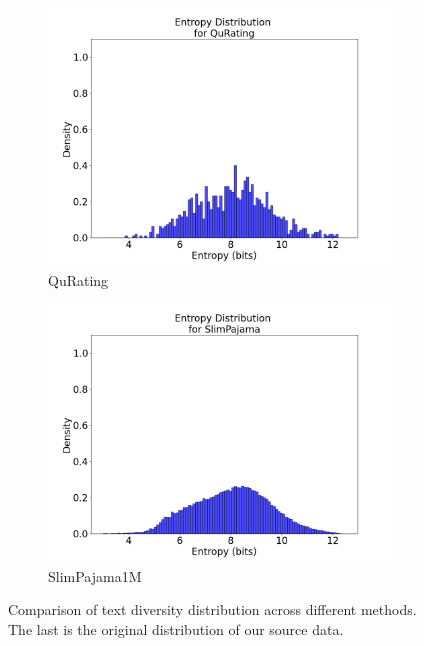 \documentclass{article}
\begin{document}
\begin{figure}[H]
\begin{subfigure}{0.32\textwidth}
    \includegraphics[width=\linewidth]{figures/IMDB_entropy_distribution_plots/entropy_distribution_ft_4rules_QuRating.png}
    \caption{QuRating}
\end{subfigure}
\begin{subfigure}{0.32\textwidth}
    \includegraphics[width=\linewidth]{figures/IMDB_entropy_distribution_plots/entropy_distribution_SlimPajama1M.png}
    \caption{SlimPajama1M}
\end{subfigure}

\caption{Comparison of text diversity distribution across different methods. The last is the original distribution of our source data.} %
\label{fig:data_distribution_IMDB_entropy}
\end{figure}
\end{document}
